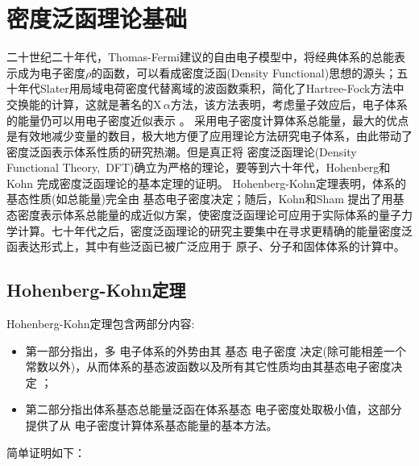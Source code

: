 \chapter{密度泛函理论基础} \label{chap:dft}

二十世纪二十年代，Thomas-Fermi{建议的自由电子模型}\cite{PCPS23-542_1927,ZP48-73_1928}中，将经典体系的总能表示成为电子密度$\rho$的函数\cite{Parr-Yang,CR91-651_1991}，可以看成密度泛函(Density Functional)思想的源头；五十年代Slater用局域电荷密度代替离域的波函数乘积，简化了Hartree-Fock方法\cite{MPCPS24-111_1928,ZP61-126_1930, PR32-339_1928}中交换能的计算，这就是著名的X\,$\alpha$方法\cite{PR81-385_1951}，该方法表明，考虑量子效应后，电子体系的能量仍可以用电子密度近似表示
。%
采用电子密度计算体系总能量，最大的优点是有效地减少变量的数目，极大地方便了应用理论方法研究电子体系，由此带动了密度泛函表示体系性质的研究热潮。但是真正将
密度泛函理论\textrm{(Density Functional Theory,~DFT)}确立为严格的理论，要等到六十年代，Hohenberg和Kohn%
完成密度泛函理论的基本定理的证明\cite{PR136-B864_1964}。
Hohenberg-Kohn定理表明，体系的基态性质(如总能量)完全由%
基态{电}子密度决定；随后，Kohn和Sham\cite{PR140-A1133_1965}%
{提出了用基态密度表示体系总能量的成近似方案，使密度泛函理论可应用于实际体系的量子力学计算。七十年代之后，密度泛函理论的研究主要集中在寻求更精确的能量密度泛函表达形式上，其中有些泛函已被}广泛应用于%
原子、分子和固体体系{的计算中\cite{CJP58-1200_1980,PRB45-13244_1992,PRA38-3098_1988,PRB33-8822_1986,PRB37-785_1988}}。

\section{Hohenberg-Kohn定理}
Hohenberg-Kohn定理\cite{PR136-B864_1964}包含两部分{内容}:
\begin{itemize}
	\item 第一部分指出，多%
{电}子体系的外势由其%
基态%
{电}子密度%
决定(除可能相差一个常数以外)，从而体系的基态波函数以及所有其它性质均由其基态电子密度决定
；\item 第二部分指出体系基态总能量{泛函}在体系基态%
{电}子密度处取极小{值}，这部分%
{提供}了从%
{电}子密度计算体系基态能量的基本方法。
\end{itemize}
简单证明如下：

